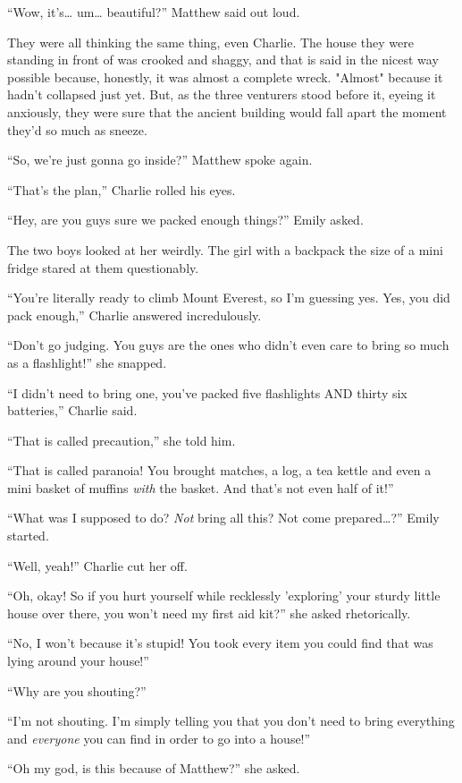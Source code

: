 “Wow, it's… um… beautiful?” Matthew said out loud.

They were all thinking the same thing, even Charlie. The house they were standing in front of was crooked and shaggy, and that is said in the nicest way possible because, honestly, it was almost a complete wreck. "Almost" because it hadn't collapsed just yet. But, as the three venturers stood before it, eyeing it anxiously, they were sure that the ancient building would fall apart the moment they'd so much as sneeze.

“So, we're just gonna go inside?” Matthew spoke again.

“That's the plan,” Charlie rolled his eyes.

“Hey, are you guys sure we packed enough things?” Emily asked.

The two boys looked at her weirdly. The girl with a backpack the size of a mini fridge stared at them questionably.

“You're literally ready to climb Mount Everest, so I'm guessing yes. Yes, you did pack enough,” Charlie answered incredulously.

“Don't go judging. You guys are the ones who didn't even care to bring so much as a flashlight!” she snapped.

“I didn't need to bring one, you've packed five flashlights AND thirty six batteries,” Charlie said.

“That is called precaution,” she told him.

“That is called paranoia! You brought matches, a log, a tea kettle and even a mini basket of muffins \textit{with} the basket. And that's not even half of it!”

“What was I supposed to do? \textit{Not} bring all this? Not come prepared…?” Emily started.

“Well, yeah!” Charlie cut her off.

“Oh, okay! So if you hurt yourself while recklessly 'exploring' your sturdy little house over there, you won't need my first aid kit?” she asked rhetorically.

“No, I won't because it's stupid! You took every item you could find that was lying around your house!”

“Why are you shouting?”

“I'm not shouting. I'm simply telling you that you don't need to bring everything and \textit{everyone} you can find in order to go into a house!”

“Oh my god, is this because of Matthew?” she asked.


